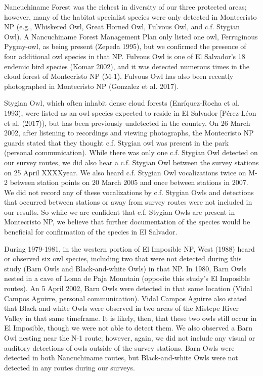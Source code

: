 \documentclass[
]{article}
\begin{document}
Nancuchiname Forest was the richest in diversity of our three protected
areas; however, many of the habitat specialist species were only
detected in Montecristo NP (e.g., Whiskered Owl, Great Horned Owl,
Fulvous Owl, and c.f. Stygian Owl). A Nancuchiname Forest Management
Plan only listed one owl, Ferruginous Pygmy-owl, as being present
(Zepeda 1995), but we confirmed the presence of four additional owl
species in that NP. Fulvous Owl is one of El Salvador's 18 endemic bird
species (Komar 2002), and it was detected numerous times in the cloud
forest of Montecristo NP (M-1). Fulvous Owl has also been recently
photographed in Montecristo NP (Gonzalez et al. 2017).

Stygian Owl, which often inhabit dense cloud forests (Enríquez-Rocha et
al. 1993), were listed as an owl species expected to reside in El
Salvador {[}Pérez-Léon et al. (2017)), but has been previously
undetected in the country. On 26 March 2002, after listening to
recordings and viewing photographs, the Montecristo NP guards stated
that they thought c.f. Stygian owl was present in the park (personal
communication). While there was only one c.f. Stygian Owl detected on
our survey routes, we did also hear a c.f. Stygian Owl between the
survey stations on 25 April XXXXyear. We also heard c.f. Stygian Owl
vocalizations twice on M-2 between station points on 20 March 2005 and
once between stations in 2007. We did not record any of these
vocalizations by c.f. Stygian Owls and detections that occurred between
stations or away from survey routes were not included in our results. So
while we are confident that c.f. Stygian Owls are present in Montecristo
NP, we believe that further documentation of the species would be
beneficial for confirmation of the species in El Salvador.

During 1979-1981, in the western portion of El Imposible NP, West (1988)
heard or observed six owl species, including two that were not detected
during this study (Barn Owls and Black-and-white Owls) in that NP. In
1980, Barn Owls nested in a cave of Loma de Paja Mountain (opposite this
study's El Imposible routes). An 5 April 2002, Barn Owls were detected
in that same location (Vidal Campos Aguirre, personal communication).
Vidal Campos Aguirre also stated that Black-and-white Owls were observed
in two areas of the Mistepe River Valley in that same timeframe. It is
likely, then, that these two owls still occur in El Imposible, though we
were not able to detect them. We also observed a Barn Owl nesting near
the N-1 route; however, again, we did not include any visual or auditory
detections of owls outside of the survey stations. Barn Owls were
detected in both Nancuchiname routes, but Black-and-white Owls were not
detected in any routes during our surveys.
\end{document}
